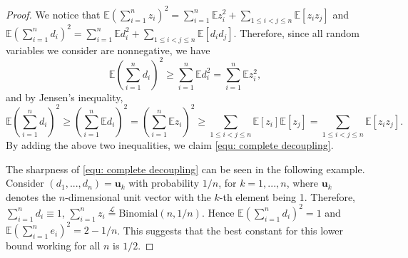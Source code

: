 \documentclass[10pt,a4paper]{amsart}
\newcommand{\E}{\mathbb{E}}
\newcommand{\sumn}{\sum\limits_{i=1}^n}
\begin{document}
\begin{proof}
     We notice that $\E (\sumn z_i) ^2 =  \sumn \E z_i^2 + \sum\limits_{1\leq i<j\leq n} \E [z_i z_j] $ and $\E (\sumn d_i) ^2 =  \sumn \E d_i^2 + \sum\limits_{1\leq i<j\leq n} \E [d_i d_j]$. Therefore, since all random variables we consider are nonnegative, we have 
     \[ \E (\sumn d_i) ^2 \geq \sumn \E d_i^2 =\sumn \E z_i^2, \]
    and by Jensen's inequality, 
    \[ \E (\sumn d_i) ^2  \geq (\sumn \E d_i)^2 =(\sumn \E z_i)^2 \geq \sum\limits_{1\leq i<j\leq n} \E [z_i]\E[z_j]  =\sum\limits_{1\leq i<j\leq n}  \E [z_i z_j] . \]
    By adding the above two inequalities, we claim \eqref{equ: complete decoupling}. 
    
    The sharpness of \eqref{equ: complete decoupling} can be seen in the following example. Consider $(d_1,...,d_n) = \boldsymbol{u}_k$ with probability $1/n$, for $k=1,...,n$, where $\boldsymbol{u}_k$ denotes the $n$-dimensional unit vector with the $k$-th element being 1. Therefore, $\sumn d_i \equiv 1$, $\sumn z_i \stackrel{\mathcal{L}}{=} \text{Binomial}(n,1/n)$. Hence $\E (\sumn d_i)^2 =1$ and $\E (\sumn e_i)^2 =2-1/n$. This suggests that the best constant for this lower bound working for all $n$ is $1/2$. 
\end{proof}
\end{document}

